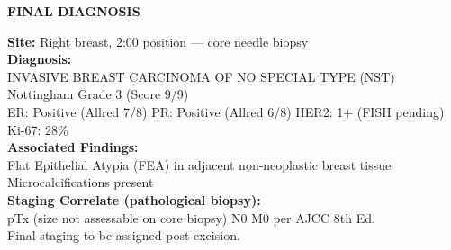 \documentclass[11pt,a4paper]{article}
\begin{document}
\par\vspace{4pt}

\begin{tcolorbox}[diagnosisbox, title={}]
  \begin{center}
  {\color{PathGold}\bfseries\large FINAL DIAGNOSIS}\\[4pt]
  \end{center}
  \color{white}
  \textbf{Site:} Right breast, 2:00 position --- core needle biopsy\\[4pt]
  \textbf{Diagnosis:}\\[2pt]
  \quad INVASIVE BREAST CARCINOMA OF NO SPECIAL TYPE (NST)\\
  \quad Nottingham Grade 3 (Score 9/9)\\
  \quad ER: Positive (Allred 7/8) \textbar{} PR: Positive (Allred 6/8) \textbar{} HER2: 1+ (FISH pending) \textbar{} Ki-67: 28\%\\[4pt]
  \textbf{Associated Findings:}\\[2pt]
  \quad Flat Epithelial Atypia (FEA) in adjacent non-neoplastic breast tissue\\
  \quad Microcalcifications present\\[4pt]
  \textbf{Staging Correlate (pathological biopsy):}\\[2pt]
  \quad pTx (size not assessable on core biopsy) N0 M0 per AJCC 8th Ed.\\
  \quad Final staging to be assigned post-excision.
\end{tcolorbox}

\newpage
\end{document}
